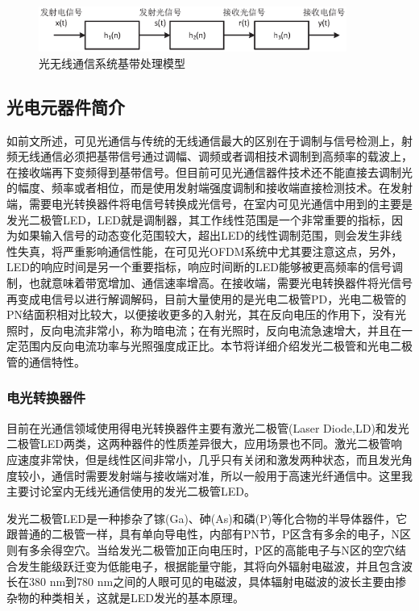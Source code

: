 \begin{figure}[htbp]
\centering
\includegraphics[width=0.9\textwidth]{figures/chapter-2/BasebandModle.eps}
\caption{光无线通信系统基带处理模型}
\label{fig:BasebandModle}
\end{figure}

\subsection{光电元器件简介}
如前文所述，可见光通信与传统的无线通信最大的区别在于调制与信号检测上，射频无线通信必须把基带信号通过调幅、调频或者调相技术调制到高频率的载波上，在接收端再下变频得到基带信号。但目前可见光通信器件技术还不能直接去调制光的幅度、频率或者相位，而是使用发射端强度调制和接收端直接检测技术。在发射端，需要电光转换器件将电信号转换成光信号，在室内可见光通信中用到的主要是发光二极管LED，LED就是调制器，其工作线性范围是一个非常重要的指标，因为如果输入信号的动态变化范围较大，超出LED的线性调制范围，则会发生非线性失真，将严重影响通信性能，在可见光OFDM系统中尤其要注意这点，另外，LED的响应时间是另一个重要指标，响应时间断的LED能够被更高频率的信号调制，也就意味着带宽增加、通信速率增高。在接收端，需要光电转换器件将光信号再变成电信号以进行解调解码，目前大量使用的是光电二极管PD，光电二极管的PN结面积相对比较大，以便接收更多的入射光，其在反向电压的作用下，没有光照时，反向电流非常小，称为暗电流；在有光照时，反向电流急速增大，并且在一定范围内反向电流功率与光照强度成正比。本节将详细介绍发光二极管和光电二极管的通信特性。
\subsubsection{电光转换器件}
目前在光通信领域使用得电光转换器件主要有激光二极管(Laser Diode,LD)和发光二极管LED两类，这两种器件的性质差异很大，应用场景也不同。激光二极管响应速度非常快，但是线性区间非常小，几乎只有关闭和激发两种状态，而且发光角度较小，通信时需要发射端与接收端对准，所以一般用于高速光纤通信中。这里我主要讨论室内无线光通信使用的发光二极管LED。

发光二极管LED是一种掺杂了镓(Ga)、砷(As)和磷(P)等化合物的半导体器件，它跟普通的二极管一样，具有单向导电性，内部有PN节，P区含有多余的电子，N区则有多余得空穴。当给发光二极管加正向电压时，P区的高能电子与N区的空穴结合发生能级跃迁变为低能电子，根据能量守能，其将向外辐射电磁波，并且包含波长在380 nm到780 nm之间的人眼可见的电磁波，具体辐射电磁波的波长主要由掺杂物的种类相关，这就是LED发光的基本原理。

